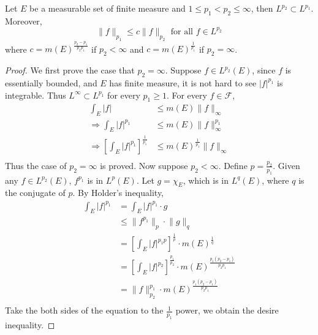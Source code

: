 \documentclass[lang=en, 12pt]{elegantbook}
\begin{document}
        \begin{corollary}
            Let $E$ be a measurable set of finite measure and 
        $1 \leq p_1 <p_2 \leq \infty$, then $L^{p_2} \subset L^{p_1}$.
        Moreover, 
        $$\lVert f\rVert_{p_1} \leq c\lVert f\rVert_{p_2} \mbox{ 
            for all } f \in L^{p_2}$$
        where $c = m(E)^{\frac{p_2-p_1}{p_2p_1}}$ if $p_2 <\infty$
        and $c = m(E)^{\frac{1}{p_1}}$ if $p_2 = \infty$.  
        \end{corollary}
        \begin{proof}
            We first prove the case that $p_2 = \infty$. Suppose 
        $f \in L^{p_2}(E)$, since $f$ is essentially bounded,
        and $E$ has finite measure, it is not hard to see $|f|^{p_1}$
        is integrable. Thus $L^{\infty} \subset L^{p_1}$ for every $p_1 \geq 1$.
        For every $f \in \mathcal{F}$,
            \begin{equation*}
                \begin{aligned}
                    \int_E |f| &\leq m(E) \lVert f\rVert_{\infty}\\
                \Rightarrow \int_E |f|^{p_1} &\leq m(E) \lVert f\rVert_{\infty}^{p_1}\\
                \Rightarrow \left[\int_E |f|^{p_1} \right]^{\frac{1}{p_1}} 
                &\leq m(E)^{\frac{1}{p_1}} \lVert f\rVert_{\infty}\\
                \end{aligned}
            \end{equation*}
        Thus the case of $p_2 = \infty $ is proved. Now suppose 
        $p_2< \infty$. Define $p=\frac{p_2}{p_1}$. Given any
        $f \in L^{p_2}(E)$, $f^{p_1}$ is in $L^p(E)$. Let $g=\chi_E$, 
        which is in $L^q(E)$, where $q$ is the conjugate of 
        $p$. By Holder's inequality,
            \begin{equation*}
                \begin{aligned}
                    \int_E |f|^{p_1} &=\int_E |f|^{p_1} \cdot g \\
                    &\leq \lVert f^{p_1} \rVert_p \cdot \lVert g \rVert_q\\
                    &= \left[\int_E |f|^{p_1p}\right]^{\frac{1}{p}} \cdot m(E)^{\frac{1}{q}}\\
                    &= \left[\int_E |f|^{p_2}\right]^{\frac{p_1}{p_2}} \cdot m(E)^{\frac{p_1(p_2-p_1)}{p_2p_1}}\\
                    &= \lVert f\rVert_{p_2}^{p_1} \cdot m(E)^{\frac{p_1(p_2-p_1)}{p_2p_1}}\\
                \end{aligned}
            \end{equation*}
            Take the both sides of the equation to the $\frac{1}{p_1}$ power, we obtain the desire 
        inequality.
        \end{proof}
\end{document}
